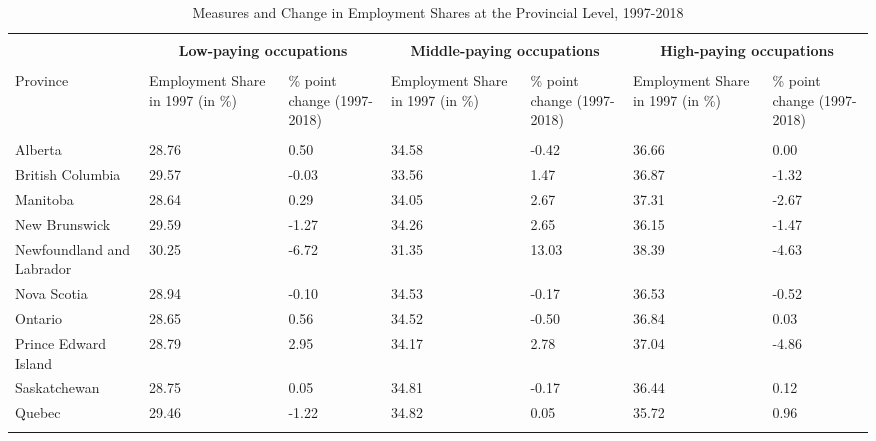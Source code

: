 \documentclass[12pt]{article}
\begin{document}
\begin{table}[!htbp] \centering 
\tiny
\caption{Measures and Change in Employment Shares at the Provincial Level, 1997-2018}
  \label{} 
\begin{tabular}{p{}p{}p{}p{}p{}p{}p{}}
\\[-1.8ex]\hline 
\hline \\[-1.8ex] 
& \multicolumn{2}{c}{\textbf{Low-paying occupations}} & \multicolumn{2}{c}{\textbf{Middle-paying occupations}} & \multicolumn{2}{c}{\textbf{High-paying occupations}}\\
\hline \\[-1.8ex] 
Province &	Employment Share in 1997 (in \%)	& \% point change (1997-2018) &	Employment Share in 1997 (in \%) & 	\% point change (1997-2018)	& Employment Share in 1997 (in \%)	& \% point change (1997-2018) \\
\hline \\[-1.8ex] 
Alberta	& 28.76	& 0.50	& 34.58	& -0.42	& 36.66	& 0.00 \\
British Columbia & 	29.57	& -0.03	& 33.56	& 1.47	& 36.87	& -1.32 \\
Manitoba	& 28.64 & 	0.29	& 34.05	& 2.67	& 37.31	& -2.67 \\
New Brunswick	& 29.59	& -1.27	& 34.26	& 2.65	& 36.15	& -1.47 \\
Newfoundland and Labrador	& 30.25	& -6.72	& 31.35	& 13.03	& 38.39 & 	-4.63 \\
Nova Scotia	& 28.94	& -0.10	& 34.53	& -0.17	& 36.53 & 	-0.52 \\
Ontario	& 28.65	& 0.56 & 	34.52	& -0.50	& 36.84	& 0.03 \\
Prince Edward Island	& 28.79	& 2.95	& 34.17	& 2.78	& 37.04	& -4.86 \\
Saskatchewan	& 28.75	& 0.05	& 34.81	& -0.17	& 36.44	& 0.12 \\
Quebec	& 29.46	& -1.22	& 34.82	& 0.05	& 35.72	& 0.96 \\
\hline 
\hline \\[-1.8ex]  
\end{tabular} 
\end{table} 
\end{document}
